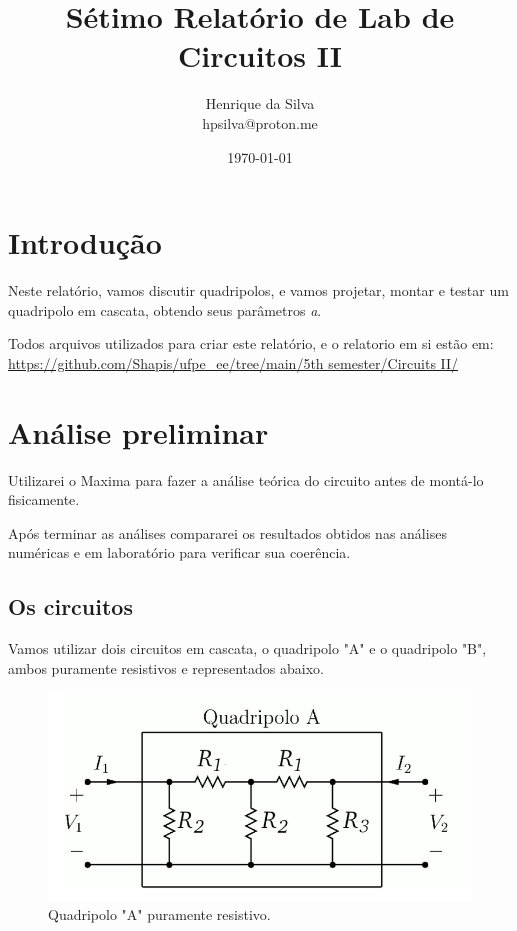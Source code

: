 \documentclass[12pt,twoside, a4paper, twocolumn]{article}
\title{Sétimo Relatório de Lab de Circuitos II}
\author{Henrique da Silva \\ hpsilva@proton.me}
\date{\today}
\begin{document}
\maketitle
{}
\newpage
\tableofcontents
\newpage




\section{Introdução}




Neste relatório, vamos discutir quadripolos, e vamos projetar, montar e testar um quadripolo em cascata, obtendo seus parâmetros \emph{a}.








Todos arquivos utilizados para criar este relatório, e o relatorio em si estão em:  \url{https://github.com/Shapis/ufpe_ee/tree/main/5th semester/Circuits II/}




\section{Análise preliminar}




Utilizarei o Maxima para fazer a análise teórica do circuito antes de montá-lo fisicamente.


Após terminar as análises compararei os resultados obtidos nas análises numéricas e em laboratório para verificar sua coerência.




\subsection{Os circuitos}


Vamos utilizar dois circuitos em cascata, o quadripolo "A" e o quadripolo "B", ambos puramente resistivos e representados abaixo.




\begin{figure}[h]
    \centering
    \includegraphics[width=1\columnwidth]{images/quadripoloa.png}
    \caption{Quadripolo "A" puramente resistivo.}
\end{figure}
\end{document}
